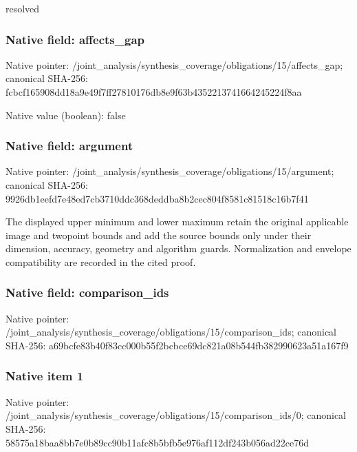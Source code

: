 \documentclass[10pt,a4paper]{article}
\begin{document}
resolved


\subsubsection{Native field: affects\_gap}


Native pointer: /joint\_analysis/synthesi\allowbreak{}s\_coverage/obligations/1\allowbreak{}5/affects\_gap; canonical SHA-256: fcbcf165908dd18a9e49f7ff\allowbreak{}27810176db8e9f63b4352213\allowbreak{}741664245224f8aa



Native value (boolean): false



\subsubsection{Native field: argument}


Native pointer: /joint\_analysis/synthesi\allowbreak{}s\_coverage/obligations/1\allowbreak{}5/argument; canonical SHA-256: 9926db1eefd7e48ed7cb3710\allowbreak{}ddc368deddba8b2cec804f85\allowbreak{}81c81518c16b7f41


The displayed upper minimum and lower maximum retain the original applicable image and twopoint bounds and add the source bounds only under their dimension, accuracy, geometry and algorithm guards. Normalization and envelope compatibility are recorded in the cited proof.


\subsubsection{Native field: comparison\_ids}


Native pointer: /joint\_analysis/synthesi\allowbreak{}s\_coverage/obligations/1\allowbreak{}5/comparison\_ids; canonical SHA-256: a69bcfe83b40f83cc000b55f\allowbreak{}2bcbce69dc821a08b544fb38\allowbreak{}2990623a51a167f9



\subsubsection{Native item 1}


Native pointer: /joint\_analysis/synthesi\allowbreak{}s\_coverage/obligations/1\allowbreak{}5/comparison\_ids/0; canonical SHA-256: 58575a18baa8bb7e0b89cc90\allowbreak{}b11afc8b5bfb5e976af112df\allowbreak{}243b056ad22ce76d
\end{document}
